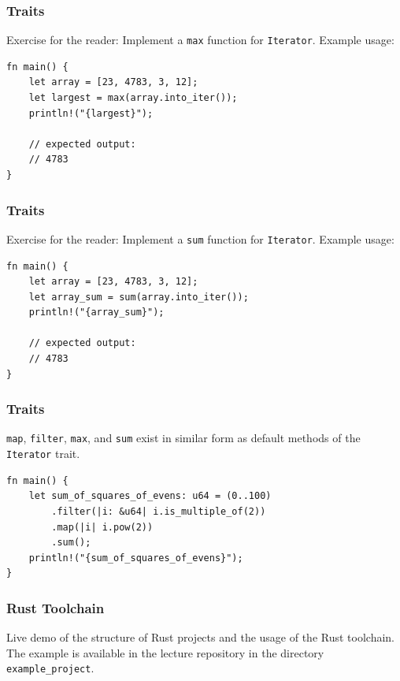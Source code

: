 \begin{frame}[fragile]
    \frametitle{Traits}
    Exercise for the reader: Implement a \texttt{max} function for \texttt{Iterator}. Example usage:
    \vfill
    \begin{verbatim}
fn main() {
    let array = [23, 4783, 3, 12];
    let largest = max(array.into_iter());
    println!("{largest}");

    // expected output:
    // 4783
}
    \end{verbatim}
\end{frame}

\begin{frame}[fragile]
    \frametitle{Traits}
    Exercise for the reader: Implement a \texttt{sum} function for \texttt{Iterator}. Example usage:
    \vfill
    \begin{verbatim}
fn main() {
    let array = [23, 4783, 3, 12];
    let array_sum = sum(array.into_iter());
    println!("{array_sum}");

    // expected output:
    // 4783
}
    \end{verbatim}
\end{frame}

\begin{frame}[fragile]
    \frametitle{Traits}
    \texttt{map}, \texttt{filter}, \texttt{max}, and \texttt{sum} exist in similar form as default methods of the \texttt{Iterator} trait.
    \pause
    \vfill
    \begin{verbatim}
fn main() {
    let sum_of_squares_of_evens: u64 = (0..100)
        .filter(|i: &u64| i.is_multiple_of(2))
        .map(|i| i.pow(2))
        .sum();
    println!("{sum_of_squares_of_evens}");
}
    \end{verbatim}
\end{frame}

\begin{frame}[fragile]
    \frametitle{Rust Toolchain}
    Live demo of the structure of Rust projects and the usage of the Rust toolchain. The example is available in the lecture repository in the directory \texttt{example\_project}.
\end{frame}


